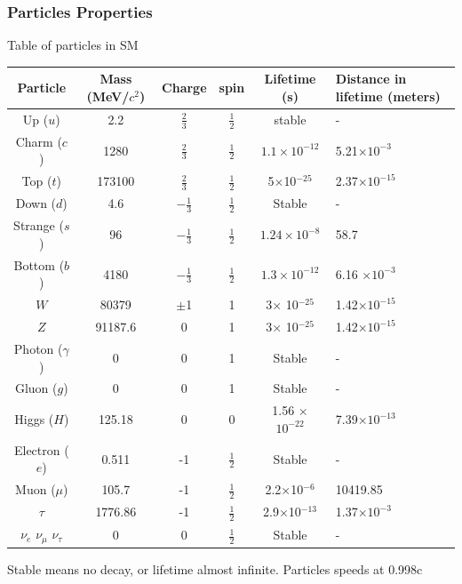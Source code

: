 \documentclass[11pt]{beamer}
\begin{document}
\begin{frame}
\frametitle{Particles Properties}
Table of particles in SM
\begin{table}
\tiny{\renewcommand{\arraystretch}{1.5}
\begin{tabular}{|c|c|c|c|c|p{2.5cm}|}
	\hline 
	Particle	& Mass (MeV/$c^2$) &Charge & spin &Lifetime (s) & Distance in lifetime (meters) \\ 
	\hline 
	Up ($u$)	& 2.2 & $\frac{2}{3}$ & $\frac{1}{2}$ & stable & -\\ 
	\hline 
	Charm ($c$)	& 1280 &$\frac{2}{3}$ & $\frac{1}{2}$ & $ 1.1 \times 10^{-12}$ & 5.21$\times 10^{-3}$ \\ 
	\hline 
	Top	($t$)& 173100 & $\frac{2}{3}$ & $\frac{1}{2}$ & 5$\times$10$^{-25}$ &2.37$\times 10^{-15}$  \\ 
	\hline 
	Down ($d$)	& 4.6 &$-\frac{1}{3}$ & $\frac{1}{2}$ & Stable & - \\ 
	\hline 
	Strange ($s$)	& 96 &$-\frac{1}{3}$ & $\frac{1}{2}$ &$1.24 \times 10^{-8}$ & 58.7 \\ 
	\hline 
	
	Bottom ($b$)	& 4180 &$-\frac{1}{3}$ & $\frac{1}{2}$ &$1.3 \times 10^{-12}$  & 6.16 $\times 10^{-3}$\\ 
	\hline 
	$W$ 	& 80379 &$\pm$1 & 1 & 3$\times$ 10$^{-25}$ & 1.42$\times 10^{-15}$\\ 
	\hline 
	$Z$ & 91187.6 &0 & 1 & 3$\times$ 10$^{-25}$ &1.42$\times 10^{-15}$ \\ 
	\hline
	Photon ($\gamma$) & 0 &0 & 1&Stable & - \\ 
	\hline
	Gluon ($g$)	& 0 &0 & 1&Stable & - \\ 
	\hline 
	Higgs ($H$)	& 125.18 &0 & 0& 1.56 $\times$ $10^{-22}$ & 7.39$\times 10^{-13}$ \\ 
	\hline 
	Electron ($e$)& 0.511 & -1 &  $\frac{1}{2}$& Stable & - \\ 
	\hline 
	Muon ($\mu$)	& 105.7 & -1 & $\frac{1}{2}$ & 2.2$\times$10$^{-6}$ & 10419.85 \\ 
	\hline 
	$\tau$	& 1776.86 &-1 & $\frac{1}{2}$ & 2.9$\times$10$^{-13}$ & 1.37$\times 10^{-3}$\\ 
	\hline 
	$\nu_e$	$\nu_\mu$ $\nu_\tau$& 0 & 0 & $\frac{1}{2}$ & Stable & -\\
	\hline 
\end{tabular} 
}
\end{table}
\tiny{Stable means no decay, or lifetime almost infinite. Particles speeds at 0.998c}
\end{frame}
\end{document}
